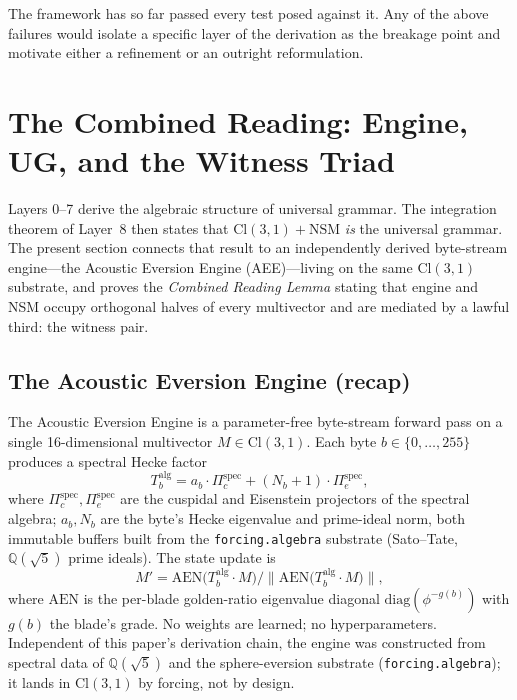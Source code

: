 \documentclass[11pt,a4paper]{article}
\theoremstyle{plain}
\theoremstyle{definition}
\theoremstyle{remark}
\numberwithin{equation}{section}
\providecommand{\Cl}{\mathrm{Cl}}
\begin{document}
The framework has so far passed every test posed against it.  Any
of the above failures would isolate a specific layer of the
derivation as the breakage point and motivate either a refinement
or an outright reformulation.


\section{The Combined Reading: Engine, UG, and the Witness Triad}
\label{sec:combined-reading}

Layers 0--7 derive the algebraic structure of universal grammar.
The integration theorem of Layer~8 then states that
$\Cl(3,1) + \mathrm{NSM}$ \emph{is} the universal grammar.  The
present section connects that result to an independently derived
byte-stream engine---the Acoustic Eversion Engine
(AEE)---living on the same $\Cl(3,1)$ substrate, and proves the
\emph{Combined Reading Lemma} stating that engine and NSM occupy
orthogonal halves of every multivector and are mediated by a
lawful third: the witness pair.

\subsection{The Acoustic Eversion Engine (recap)}
\label{sec:aee}

The Acoustic Eversion Engine is a parameter-free byte-stream
forward pass on a single 16-dimensional multivector $M \in
\Cl(3,1)$.  Each byte $b \in \{0,\dots,255\}$ produces a spectral
Hecke factor
\[
  T_b^{\mathrm{alg}} = a_b \cdot \Pi_c^{\mathrm{spec}}
                       + (N_b + 1) \cdot \Pi_e^{\mathrm{spec}},
\]
where $\Pi_c^{\mathrm{spec}}, \Pi_e^{\mathrm{spec}}$ are the
cuspidal and Eisenstein projectors of the spectral
algebra; $a_b, N_b$ are the byte's Hecke eigenvalue and prime-ideal
norm, both immutable buffers built from the
\texttt{forcing.algebra} substrate (Sato--Tate, $\mathbb{Q}(\sqrt{5})$
prime ideals).  The state update is
\[
  M' = \mathrm{AEN}\bigl(T_b^{\mathrm{alg}} \cdot M\bigr) \big/
        \bigl\|\mathrm{AEN}\bigl(T_b^{\mathrm{alg}} \cdot
        M\bigr)\bigr\|,
\]
where $\mathrm{AEN}$ is the per-blade golden-ratio eigenvalue
diagonal $\mathrm{diag}(\phi^{-g(b)})$ with $g(b)$ the blade's
grade.  No weights are learned; no hyperparameters.  Independent
of this paper's derivation chain, the engine was constructed from
spectral data of $\mathbb{Q}(\sqrt{5})$ and the sphere-eversion
substrate (\texttt{forcing.algebra}); it lands in $\Cl(3,1)$ by
forcing, not by design.
\end{document}
